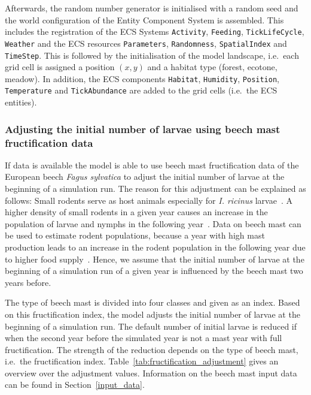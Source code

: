 \documentclass[a4paper, 11pt]{scrartcl}
\newcommand{\inlinecode}[1]{\texttt{\small #1}}
\begin{document}
Afterwards, the random number generator is initialised with a random seed and the world configuration of the Entity Component System is assembled. This includes the registration of the ECS Systems \inlinecode{Activity}, \inlinecode{Feeding}, \inlinecode{TickLifeCycle}, \inlinecode{Weather} and the ECS resources \inlinecode{Parameters}, \inlinecode{Randomness}, \inlinecode{SpatialIndex} and \inlinecode{TimeStep}. This is followed by the initialisation of the model landscape, i.e.\ each grid cell is assigned a position $(x, y)$ and a habitat type (forest, ecotone, meadow). In addition, the ECS components \inlinecode{Habitat}, \inlinecode{Humidity}, \inlinecode{Position}, \inlinecode{Temperature} and \inlinecode{TickAbundance} are added to the grid cells (i.e.\ the ECS entities).

\subsubsection{Adjusting the initial number of larvae using beech mast fructification data}\label{subsubsec:initial_larvae_with_beech_mast}
If data is available the model is able to use beech mast fructification data of the European beech \textit{Fagus sylvatica} to adjust the initial number of larvae at the beginning of a simulation run. The reason for this adjustment can be explained as follows: Small rodents serve as host animals especially for \textit{I. ricinus} larvae~\parencite{Cayol.2017}. A higher density of small rodents in a given year causes an increase in the population of larvae and nymphs in the following year~\parencite{Brugger.2018}. Data on beech mast can be used to estimate rodent populations, because a year with high mast production leads to an increase in the rodent population in the following year due to higher food supply~\parencite{Clement.2009}. Hence, we assume that the initial number of larvae at the beginning of a simulation run of a given year is influenced by the beech mast two years before.

The type of beech mast is divided into four classes and given as an index. Based on this fructification index, the model adjusts the initial number of larvae at the beginning of a simulation run. The default number of initial larvae is reduced if when the second year before the simulated year is not a mast year with full fructification. The strength of the reduction depends on the type of beech mast, i.e.\ the fructification index. Table~\ref{tab:fructification_adjustment} gives an overview over the adjustment values. Information on the beech mast input data can be found in Section~\ref{input_data}.
\end{document}
